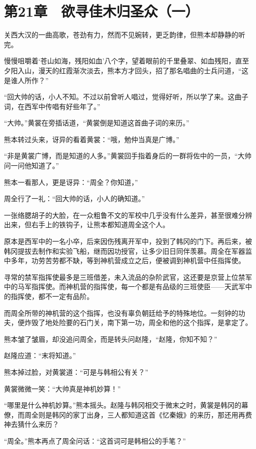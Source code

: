 \section{第21章　欲寻佳木归圣众（一）}

关西大汉的一曲高歌，苍劲有力，然而不见婉转，更乏韵律，但熊本却静静的听完。

慢慢咀嚼着‘苍山如海，残阳如血’八个字，望着眼前的千里叠翠、如血残阳，直至夕阳入山，漫天的红霞渐次淡去，熊本方才回头，招了那名唱曲的士兵问道，“这是谁人所作？”

“回大帅的话，小人不知。不过以前曾听人唱过，觉得好听，所以学了来。这曲子词，在西军中传唱有好些年了。”

“大帅。”黄裳在旁插话道，“黄裳倒是知道这首曲子词的来历。”

熊本转过头来，讶异的看着黄裳：“哦，勉仲当真是广博。”

“非是黄裳广博，而是知道的人多。”黄裳回手指着身后的一群将佐中的一员，“大帅问一问他知道了。”

熊本一看那人，更是讶异：“周全？你知道，”

周全行了一礼：“回大帅的话，小人的确知道。”

一张络腮胡子的大脸，在一众粗鲁不文的军校中几乎没有什么差异，甚至很难分辨出来，但右手上的铁钩子，让熊本都知道周全这个人。

原本是西军中的一名小卒，后来因伤残离开军中，投到了韩冈的门下。再后来，被韩冈提拔去制作和实验飞船，继而因功授官，让多少旧日同伴羡慕。周全在军器监中多年，功劳苦劳都不缺，等到神机营成立之后，便被调到神机营中任指挥使。

寻常的禁军指挥使最多是三班借差，未入流品的杂阶武官，这还要是京营上位禁军中的马军指挥使。而神机营的指挥使，每一个都是有品级的三班使臣——天武军中的指挥使，都不一定有品阶。

而周全所带的神机营的这个指挥，也没有辜负朝廷给予的特殊地位。一刻钟的功夫，便炸毁了地处险要的石门关，南下第一功，周全和他的这个指挥，是拿定了。

熊本皱了皱眉，却没追问周全，而是转头问赵隆，“赵隆，你知不知？”

赵隆应道：“末将知道。”

熊本掉过脸，对黄裳道：“可是与韩相公有关？”

黄裳微微一笑：“大帅真是神机妙算！”

“哪里是什么神机妙算。”熊本摇头。赵隆与韩冈相交于微末之时，黄裳是韩冈的幕僚，而周全则是韩冈的家丁出身，三人都知道这首《忆秦娥》的来历，那还用再费神去猜什么来历？

“周全。”熊本再点了周全问话：“这首词可是韩相公的手笔？”

